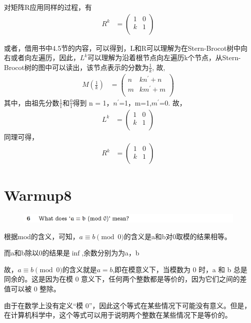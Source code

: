 \documentclass[]{article}
\begin{document}
对矩阵R应用同样的过程，有
\begin{align}
    R^k &=
    \begin{pmatrix}
        1 & 0\\
        k & 1\\
    \end{pmatrix}
\end{align}

或者，借用书中4.5节的内容，可以得到，L和R可以理解为在Stern-Brocot树中向右或者向左遍历，因此，$L^k$可以理解为沿着根节点向左遍历k个节点，从Stern-Brocot树的图中可以读出，该节点表示的分数为$\frac{1}{k}$,
故,
\begin{align}
    M(\frac{1}{k})&= 
    \begin{pmatrix}
        n & kn^{'}+n\\
        m & km^{'}+m\\
    \end{pmatrix}
\end{align}
其中，由祖先分数$\frac{1}{1}$和$\frac{0}{1}$得到 n = 1，$n^{'}$=1，m=1,$m^{'}$=0.
故，
\begin{align}
    L^k &=
    \begin{pmatrix}
        1 & 0\\
        k & 1\\
    \end{pmatrix}
\end{align}
同理可得，
\begin{align}
    R^k &=
    \begin{pmatrix}
        1 & 0\\
        k & 1\\
    \end{pmatrix}
\end{align}

\section*{Warmup8}
\begin{figure}[H]
    \includegraphics[scale = 0.6]{2023-03-16-10-46-48.png}
\end{figure}
根据mod的含义，可知，$a \equiv b \pmod{0}$的含义是a和b对0取模的结果相等。\par 
而a和b除以0的结果是$\inf$,余数分别为为a，b\par 
故，$a \equiv b \pmod{0}$的含义就是$a = b$,即在模意义下，当模数为 0 时，a 和 b 总是同余的。这是因为在模 0 意义下，任何两个整数都是等价的，因为它们之间的差值可以被 0 整除。\par 
由于在数学上没有定义“模 0”，因此这个等式在某些情况下可能没有意义。但是，在计算机科学中，这个等式可以用于说明两个整数在某些情况下是等价的。
\end{document}
